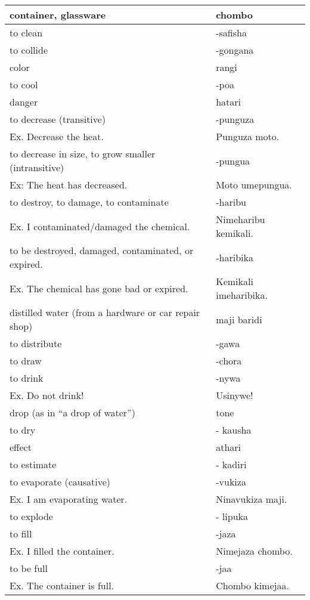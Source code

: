 \begin{center}
\begin{longtable}{|p{}|p{}|}
container, glassware	&	chombo	\\	\hline
to clean	&	-safisha	\\	\hline
to collide	&	-gongana	\\	\hline
color	&	rangi	\\	\hline
to cool	&	-poa	\\	\hline
danger	&	hatari	\\	\hline
to decrease (transitive)	&	-punguza	\\	
        Ex. Decrease the heat.	&	        Punguza moto.  	\\	\hline
to decrease in size, to grow smaller (intransitive)	&	-pungua	\\	
        Ex: The heat has decreased.	&	        Moto umepungua.	\\	\hline
to destroy, to damage, to contaminate	&	-haribu	\\	
        Ex. I contaminated/damaged the chemical.	&	        Nimeharibu kemikali.	\\	\hline
to be destroyed, damaged, contaminated, or expired.	&	-haribika	\\	
        Ex. The chemical has gone bad or expired.	&	        Kemikali imeharibika.	\\	\hline
distilled water (from a hardware or car repair shop) 	&	maji baridi	\\	\hline
to distribute	&	-gawa	\\	\hline
to draw	&	-chora	\\	\hline
to drink	&	-nywa	\\	
        Ex. Do not drink!	&	        Usinywe!	\\	\hline
drop (as in “a drop of water”)	&	tone 	\\	\hline
to dry	&	- kausha	\\	\hline
effect	&	athari	\\	\hline
to estimate	&	- kadiri	\\	\hline
to evaporate (causative)	&	-vukiza 	\\	
        Ex. I am evaporating water. 	&	        Ninavukiza maji.	\\	\hline
to explode	&	- lipuka	\\	\hline
to fill	&	-jaza	\\	
        Ex. I filled the container.	&	        Nimejaza chombo.	\\	\hline
to be full	&	-jaa	\\	
        Ex. The container is full.	&	        Chombo kimejaa. 	\\	\hline

\end{longtable}
\end{center}
